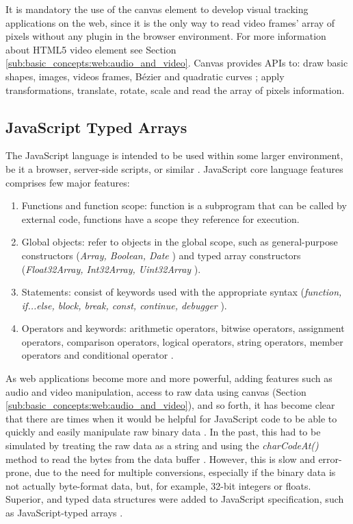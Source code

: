 It is mandatory the use of the canvas element to develop visual tracking applications on the web, since it is the only way to read video frames' array of pixels without any plugin in the browser environment. For more information about HTML5 video element see Section \ref{sub:basic_concepts:web:audio_and_video}. Canvas provides APIs to: draw basic shapes, images, videos frames, Bézier \cite{piegl1993fundamental} and quadratic curves \cite{piegl1993fundamental,Hartley2004}; apply transformations, translate, rotate, scale and read the array of pixels information.


\subsection{JavaScript Typed Arrays} %
\label{sub:basic_concepts:web:javascript_typed_arrays}

The JavaScript language \cite{International2009} is intended to be used within some larger environment, be it a browser, server-side scripts, or similar \cite{Grosskurth2005}. JavaScript core language features comprises few major features:

\begin{enumerate}
\item Functions and function scope: function is a subprogram that can be called by external code, functions have a scope they reference for execution.
\item Global objects: refer to objects in the global scope, such as general-purpose constructors (\textit{Array, Boolean, Date} \etc) and typed array constructors (\textit{Float32Array, Int32Array, Uint32Array} \etc).
\item Statements: consist of keywords used with the appropriate syntax (\textit{function, if...else, block, break, const, continue, debugger \etc}).
\item Operators and keywords: arithmetic operators, bitwise operators, assignment operators, comparison operators, logical operators, string operators, member operators and conditional operator \cite{MDN2013}.
\end{enumerate}

As web applications become more and more powerful, adding features such as audio and video manipulation, access to raw data using canvas (Section \ref{sub:basic_concepts:web:audio_and_video}), and so forth, it has become clear that there are times when it would be helpful for JavaScript code to be able to quickly and easily manipulate raw binary data \cite{Canvas2013,TypedArray2013}. In the past, this had to be simulated by treating the raw data as a string and using the \textit{charCodeAt()} method to read the bytes from the data buffer \cite{MDN2013,TypedArray2013}. However, this is slow and error-prone, due to the need for multiple conversions, especially if the binary data is not actually byte-format data, but, for example, 32-bit integers or floats. Superior, and typed data structures were added to JavaScript specification, such as JavaScript-typed arrays \cite{MDN2013,International2009}.

